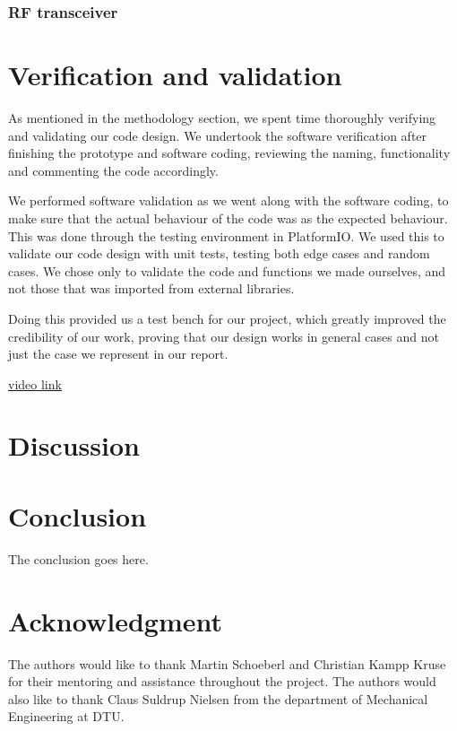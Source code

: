 \documentclass[conference]{IEEEtran}
\begin{document}
\subsubsection{RF transceiver}

\section{Verification and validation} %
As mentioned in the methodology section, we spent time thoroughly verifying and validating our code design. We undertook the software verification after finishing the prototype and software coding, reviewing the naming, functionality and commenting the code accordingly.

We performed software validation as we went along with the software coding, to make sure that the actual behaviour of the code was as the expected behaviour. This was done through the testing environment in PlatformIO. We used this to validate our code design with unit tests, testing both edge cases and random cases. We chose only to validate the code and functions we made ourselves, and not those that was imported from external libraries.

Doing this provided us a test bench for our project, which greatly improved the credibility of our work, proving that our design works in general cases and not just the case we represent in our report.

\href{https://youtu.be/-iwST3REn40}{video link}
\section{Discussion}

\section{Conclusion}
The conclusion goes here.



\section*{Acknowledgment}
The authors would like to thank Martin Schoeberl and Christian Kampp Kruse for their mentoring and assistance throughout the project. The authors would also like to thank Claus Suldrup Nielsen from the department of Mechanical Engineering at DTU.


\printbibliography
\end{document}
